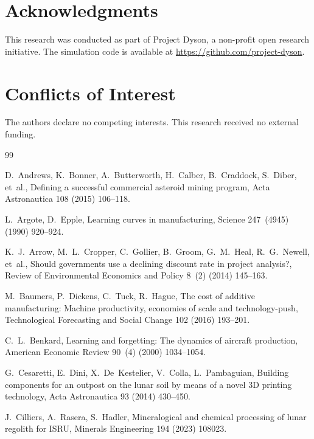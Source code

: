 \documentclass[preprint,12pt]{elsarticle}
\begin{document}
\section*{Acknowledgments}

This research was conducted as part of Project Dyson, a non-profit open research initiative. The simulation code is available at \url{https://github.com/project-dyson}.

\section*{Conflicts of Interest}

The authors declare no competing interests. This research received no external funding.

\begin{thebibliography}{99}

D.~Andrews, K.~Bonner, A.~Butterworth, H.~Calber, B.~Craddock, S.~Diber, et~al.,
\newblock Defining a successful commercial asteroid mining program,
\newblock Acta Astronautica 108 (2015) 106--118.

L.~Argote, D.~Epple,
\newblock Learning curves in manufacturing,
\newblock Science 247~(4945) (1990) 920--924.

K.~J.~Arrow, M.~L.~Cropper, C.~Gollier, B.~Groom, G.~M.~Heal, R.~G.~Newell, et~al.,
\newblock Should governments use a declining discount rate in project analysis?,
\newblock Review of Environmental Economics and Policy 8~(2) (2014) 145--163.

M.~Baumers, P.~Dickens, C.~Tuck, R.~Hague,
\newblock The cost of additive manufacturing: Machine productivity, economies of scale and technology-push,
\newblock Technological Forecasting and Social Change 102 (2016) 193--201.

C.~L.~Benkard,
\newblock Learning and forgetting: The dynamics of aircraft production,
\newblock American Economic Review 90~(4) (2000) 1034--1054.

G.~Cesaretti, E.~Dini, X.~De~Kestelier, V.~Colla, L.~Pambaguian,
\newblock Building components for an outpost on the lunar soil by means of a novel 3D printing technology,
\newblock Acta Astronautica 93 (2014) 430--450.

J.~Cilliers, A.~Rasera, S.~Hadler,
\newblock Mineralogical and chemical processing of lunar regolith for ISRU,
\newblock Minerals Engineering 194 (2023) 108023.


\end{thebibliography}
\end{document}
